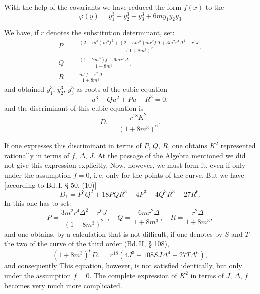 With the help of the covariants we have reduced the form $f(x)$ to the
\[
\varphi(y) = y_1^3+y_2^3+y_3^3+6my_1y_2y_3
\]

We have, if $r$ denotes the substitution determinant, set:
\begin{align*}
P &= \frac{(2+m^3)m^3f^2+(2-5m^3)mr^2f\Delta+3m^2r^4\Delta^4-r^6J}{(1+8m^3)^2}, %
\\
Q &= \frac{(1+2m^3)f-6mr^2\Delta}{1+8m^3}, \\
R &= \frac{m^2f+r^2\Delta}{1+8m^3}
\end{align*}
and obtained $y_1^3$, $y_2^3$, $y_3^3$ as roots of the cubic
equation
\[
u^3-Qu^2+Pu-R^3=0,
\]
and the discriminant of this cubic equation is
\[
D_1 = \frac{r^{18}K^2}{(1+8m^3)^6}.
\]

If one expresses this discriminant in terms of $P$, $Q$, $R$, one
obtains $K^2$ represented rationally in terms of $f$, $\Delta$, $J$. At
the passage of the Algebra mentioned we did not give this expression
explicitly. Now, however, we must form it, even if only under the
assumption $f=0$, i.\,e. only for the points of the curve.
But we have [according to Bd.\,I, § 50, (10)]
\[
D_1 = P^2Q^2+18PQR^3-4P^3-4Q^3R^3-27R^6.
\]
In this one has to set:
\[
P = \frac{3m^2r^4\Delta^2-r^6J}{(1+8m^3)^2}, \quad Q = \frac{-6mr^2\Delta}{1+8m^3}, \quad R = \frac{r^2\Delta}{1+8m^3},
\]
and one obtains, by a calculation that is not difficult, if one denotes
by $S$ and $T$ the two  of the curve of the third order
(Bd.\,II, § 108),
\[
(1+8m^3)^6D_1 = r^{18}(4J^3+108SJ\Delta^4-27T\Delta^6),
\]
and consequently
This equation, however, is not satisfied identically, but only under
the assumption $f=0$. The complete expression of $K^2$ in terms of
$J$, $\Delta$, $f$ becomes very much more complicated.
